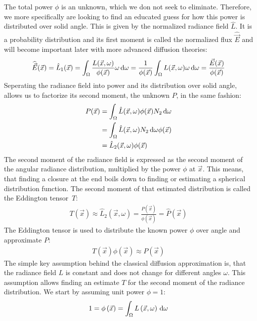 The total power $\phi$ is an unknown, which we don not seek to eliminate. Therefore, we more specifically are looking to find an educated guess for how this power is distributed over solid angle. This is given by the normalized radiance field $\hat{L}$. It is a probability distribution and its first moment is called the normalized flux $\widehat{\vec{E}}$ and will become important later with more advanced diffusion theories:
\begin{align*}
\widehat{\vec{E}}(\vec{x}) = \hat{L}_1(\vec{x}) = \int_{\Omega}\frac{L(\vec{x}, \omega)}{\phi(\vec{x})}\omega\,\mathrm{d}\omega = \frac{1}{\phi(\vec{x})}\int_{\Omega}L(\vec{x}, \omega)\omega\,\mathrm{d}\omega = \frac{\vec{E}(\vec{x})}{\phi(\vec{x})}
\end{align*}
Seperating the radiance field into power and its distribution over solid angle, allows us to factorize its second moment, the unknown $P$, in the same fashion:
\begin{align*}
P(\vec{x}) &=
\int_{\Omega}{\hat{L}(\vec{x}, \omega)\phi(\vec{x})N_2\,\mathrm{d}\omega}\\
&= \int_{\Omega}{\hat{L}(\vec{x}, \omega)N_2\,\mathrm{d}\omega}\phi(\vec{x})\\
&= \hat{L}_2(\vec{x}, \omega)\phi(\vec{x})
\end{align*}
The second moment of the radiance field is expressed as the second moment of the angular radiance distribution, multiplied by the power $\phi$ at $\vec{x}$. This means, that finding a closure at the end boils down to finding or estimating a spherical distribution function. The second moment of that estimated distribution is called the Eddington tensor~$T$:
\begin{align}
\label{eq:eddington_tensor}
T(\vec{x}) \approx \hat{L}_2(\vec{x}, \omega) =
\frac{P(\vec{x})}{\phi(\vec{x})} =
\widehat{P}(\vec{x})
\end{align}
The Eddington tensor is used to distribute the known power $\phi$ over angle and approximate $P$:
\begin{align*}
T(\vec{x})\phi(\vec{x}) \approx 
P(\vec{x})
\end{align*}
The simple key assumption behind the classical diffusion approximation is, that the radiance field $L$ is constant and does not change for different angles $\omega$. This assumption allows finding an estimate $T$ for the second moment of the radiance distribution. We start by assuming unit power $\phi = 1$:
\begin{align*}
1 = \phi\left(\vec{x}\right) = \int_\Omega{L\left(\vec{x}, \omega\right)\,\mathrm{d}\omega}
\end{align*}
